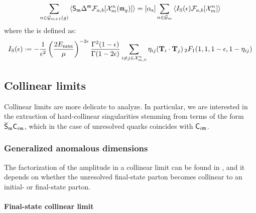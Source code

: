 \begin{equation}
  \sum_{n \in \mathcal{G}_{m+1}(g)} \left\langle \mathsf{S}_{\mathfrak{m}} \Delta^{\mathfrak{m}} \mathcal{F}_{a,b}[\mathcal{X}^{n}_{m}(\mathfrak{m}_g)] \right\rangle = [\alpha_\text{s}] \sum_{n \in \mathcal{G}_m} \left\langle I_\text{S}(\epsilon) \mathcal{F}_{a,b}[\mathcal{X}^{n}_{m}] \right\rangle
\end{equation}
where the  is defined as:
\begin{equation}
  \iso(\de) \defeq - \frac{1}{\de^2} \left( \frac{2\ema}{\mu} \right)^{-2\de} \frac{\Gamma^2(1-\de)}{\Gamma(1-2\de)} \sum_{i \neq j \in \fsp{n}{m}} \eta_{ij} (\cc) \,\hyp(1,1,1-\de,1-\eta_{ij})
\end{equation}

\subsection{Collinear limits}

Collinear limits are more delicate to analyze. In particular, we are interested in the extraction of hard-collinear singularities stemming from terms of the form $ \overline{\mathsf{S}}_{\mathfrak{m}} \mathsf{C}_{i\mathfrak{m}} $, which in the case of unresolved quarks coincides with $ \mathsf{C}_{i\mathfrak{m}} $.

\subsubsection{Generalized anomalous dimensions}

The factorization of the amplitude in a collinear limit can be found in \cite{Catani-1997}, and it depends on whether the unresolved final-state parton becomes collinear to an initial- or final-state parton.

\paragraph{Final-state collinear limit}

